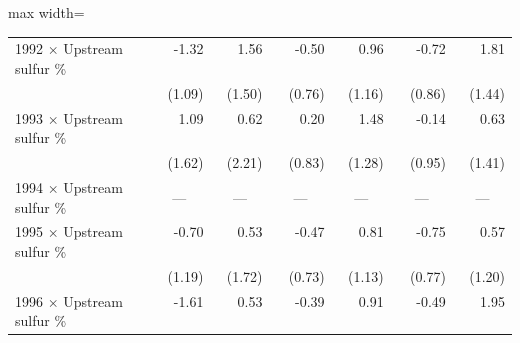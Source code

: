\begin{table}[htbp]
{\begin{adjustbox}{max width=\linewidth}
\begin{tabular}{lrrrrrr}
1992 $\times$ Upstream sulfur \% & \phantom{(}-1.32$^{\phantom{*}\phantom{*}\phantom{*}}$ & \phantom{(}\phantom{-}1.56$^{\phantom{*}\phantom{*}\phantom{*}}$ & \phantom{(}-0.50$^{\phantom{*}\phantom{*}\phantom{*}}$ & \phantom{(}\phantom{-}0.96$^{\phantom{*}\phantom{*}\phantom{*}}$ & \phantom{(}-0.72$^{\phantom{*}\phantom{*}\phantom{*}}$ & \phantom{(}\phantom{-}1.81$^{\phantom{*}\phantom{*}\phantom{*}}$ \\
 & (\phantom{-}1.09)\phantom{$^{***}$} & (\phantom{-}1.50)\phantom{$^{***}$} & (\phantom{-}0.76)\phantom{$^{***}$} & (\phantom{-}1.16)\phantom{$^{***}$} & (\phantom{-}0.86)\phantom{$^{***}$} & (\phantom{-}1.44)\phantom{$^{***}$} \\
1993 $\times$ Upstream sulfur \% & \phantom{(}\phantom{-}1.09$^{\phantom{*}\phantom{*}\phantom{*}}$ & \phantom{(}\phantom{-}0.62$^{\phantom{*}\phantom{*}\phantom{*}}$ & \phantom{(}\phantom{-}0.20$^{\phantom{*}\phantom{*}\phantom{*}}$ & \phantom{(}\phantom{-}1.48$^{\phantom{*}\phantom{*}\phantom{*}}$ & \phantom{(}-0.14$^{\phantom{*}\phantom{*}\phantom{*}}$ & \phantom{(}\phantom{-}0.63$^{\phantom{*}\phantom{*}\phantom{*}}$ \\
 & (\phantom{-}1.62)\phantom{$^{***}$} & (\phantom{-}2.21)\phantom{$^{***}$} & (\phantom{-}0.83)\phantom{$^{***}$} & (\phantom{-}1.28)\phantom{$^{***}$} & (\phantom{-}0.95)\phantom{$^{***}$} & (\phantom{-}1.41)\phantom{$^{***}$} \\
1994 $\times$ Upstream sulfur \% & \multicolumn{1}{c}{---} & \multicolumn{1}{c}{---} & \multicolumn{1}{c}{---} & \multicolumn{1}{c}{---} & \multicolumn{1}{c}{---} & \multicolumn{1}{c}{---} \\
1995 $\times$ Upstream sulfur \% & \phantom{(}-0.70$^{\phantom{*}\phantom{*}\phantom{*}}$ & \phantom{(}\phantom{-}0.53$^{\phantom{*}\phantom{*}\phantom{*}}$ & \phantom{(}-0.47$^{\phantom{*}\phantom{*}\phantom{*}}$ & \phantom{(}\phantom{-}0.81$^{\phantom{*}\phantom{*}\phantom{*}}$ & \phantom{(}-0.75$^{\phantom{*}\phantom{*}\phantom{*}}$ & \phantom{(}\phantom{-}0.57$^{\phantom{*}\phantom{*}\phantom{*}}$ \\
 & (\phantom{-}1.19)\phantom{$^{***}$} & (\phantom{-}1.72)\phantom{$^{***}$} & (\phantom{-}0.73)\phantom{$^{***}$} & (\phantom{-}1.13)\phantom{$^{***}$} & (\phantom{-}0.77)\phantom{$^{***}$} & (\phantom{-}1.20)\phantom{$^{***}$} \\
1996 $\times$ Upstream sulfur \% & \phantom{(}-1.61$^{\phantom{*}\phantom{*}\phantom{*}}$ & \phantom{(}\phantom{-}0.53$^{\phantom{*}\phantom{*}\phantom{*}}$ & \phantom{(}-0.39$^{\phantom{*}\phantom{*}\phantom{*}}$ & \phantom{(}\phantom{-}0.91$^{\phantom{*}\phantom{*}\phantom{*}}$ & \phantom{(}-0.49$^{\phantom{*}\phantom{*}\phantom{*}}$ & \phantom{(}\phantom{-}1.95$^{\phantom{*}\phantom{*}\phantom{*}}$ \\

\end{tabular}
\end{adjustbox}}
\end{table}
